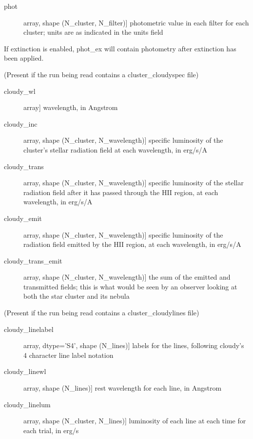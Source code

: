 \documentclass[letterpaper,10pt,english]{sphinxmanual}
\begin{document}
\begin{fulllineitems}
\begin{description}
\begin{description}
\item[{phot}] \leavevmode{[}array, shape (N\_cluster, N\_filter){]}
photometric value in each filter for each cluster; units are as
indicated in the units field

\end{description}

If extinction is enabled, phot\_ex will contain photometry  
after extinction has been applied.

(Present if the run being read contains a cluster\_cloudyspec file)
\begin{description}
\item[{cloudy\_wl}] \leavevmode{[}array{]}
wavelength, in Angstrom

\item[{cloudy\_inc}] \leavevmode{[}array, shape (N\_cluster, N\_wavelength){]}
specific luminosity of the cluster's stellar radiation field at
each wavelength, in erg/s/A

\item[{cloudy\_trans}] \leavevmode{[}array, shape (N\_cluster, N\_wavelength){]}
specific luminosity of the stellar radiation field after it has
passed through the HII region, at each wavelength, in erg/s/A

\item[{cloudy\_emit}] \leavevmode{[}array, shape (N\_cluster, N\_wavelength){]}
specific luminosity of the radiation field emitted by the HII
region, at each wavelength, in erg/s/A

\item[{cloudy\_trans\_emit}] \leavevmode{[}array, shape (N\_cluster, N\_wavelength){]}
the sum of the emitted and transmitted fields; this is what
would be seen by an observer looking at both the star cluster
and its nebula

\end{description}

(Present if the run being read contains a cluster\_cloudylines file)
\begin{description}
\item[{cloudy\_linelabel}] \leavevmode{[}array, dtype='S4', shape (N\_lines){]}
labels for the lines, following cloudy's 4 character line label
notation

\item[{cloudy\_linewl}] \leavevmode{[}array, shape (N\_lines){]}
rest wavelength for each line, in Angstrom

\item[{cloudy\_linelum}] \leavevmode{[}array, shape (N\_cluster, N\_lines){]}
luminosity of each line at each time for each trial, in erg/s


\end{description}
\end{description}
\end{fulllineitems}
\end{document}

